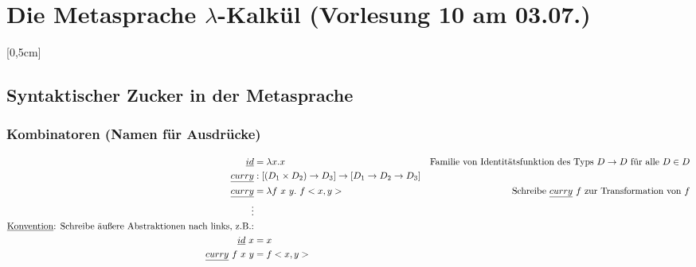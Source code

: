 \section{Die Metasprache $\lambda$-Kalkül \tiny (Vorlesung 10 am 03.07.)}
[0,5cm]

\subsection{Syntaktischer Zucker in der Metasprache}
\subsubsection{Kombinatoren (Namen für Ausdrücke)}
\begin{align*}
\underline{id} &= \lambda x.x &\text{Familie von Identitätsfunktion des Typs } D \rightarrow D \text{ für alle } D \in D\\
\underline{curry} &: [(D_1 \times D_2) \rightarrow D_3] \rightarrow [D_1 \rightarrow D_2 \rightarrow D_3]\\
\underline{curry} &= \lambda f \ x \ y. \ f <x,y> & \text{ Schreibe } \underline{curry} \ f \text{ zur Transformation von } f\\
\vdots \\
\text{\underline{Konvention}: Schreibe äußere Abstraktionen nach links, z.B.:}\\
\underline{id} \ x & = x\\
\underline{curry} \ f \ x \ y &= f<x,y>\\
\end{align*}
